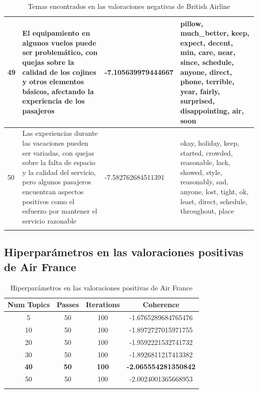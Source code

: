 \documentclass{report}
\begin{document}
{{\begin{longtable}{|p{1cm}|p{4cm}|p{4cm}|p{6cm}|}
                    \hline
                    49 & El equipamiento en algunos vuelos puede ser problemático, con quejas sobre la calidad de los cojines y otros elementos básicos, afectando la experiencia de los pasajeros & -7.105639979444667 & pillow, much\_better, keep, expect, decent, min, care, near, since, schedule, anyone, direct, phone, terrible, year, fairly, surprised, disappointing, air, soon \\
                    \hline
                    50 & Las experiencias durante las vacaciones pueden ser variadas, con quejas sobre la falta de espacio y la calidad del servicio, pero algunos pasajeros encuentran aspectos positivos como el esfuerzo por mantener el servicio razonable & -7.582762684511391 & okay, holiday, keep, started, crowded, reasonable, lack, showed, style, reasonably, sad, anyone, lost, tight, ok, least, direct, schedule, throughout, place \\
                    \hline
                    \caption{Temas encontrados en las valoraciones negativas de British Airline}
                \end{longtable}
            \clearpage\subsection{Hiperparámetros en las valoraciones positivas de Air France}
                \label{tab:hiperparametros_air_france_positivas}
                \begin{longtable}{|c|c|c|c|}
                    \hline
                    \textbf{Num Topics} & \textbf{Passes} & \textbf{Iterations} & \textbf{Coherence} \\
                    \hline
                    5 & 50 & 100 & -1.6765289684765476 \\
                    \hline
                    10 & 50 & 100 & -1.8972727015971755 \\
                    \hline
                    20 & 50 & 100 & -1.9592221532741732 \\
                    \hline
                    30 & 50 & 100 & -1.8926811217413382 \\
                    \hline
                    \textbf{40} & \textbf{50} & \textbf{100} & \textbf{-2.065554281350842} \\
                    \hline
                    50 & 50 & 100 & -2.0024001365668953 \\
                    \hline
                    \caption{Hiperparámetros en las valoraciones positivas de Air France}

\end{longtable}}}
\end{document}
